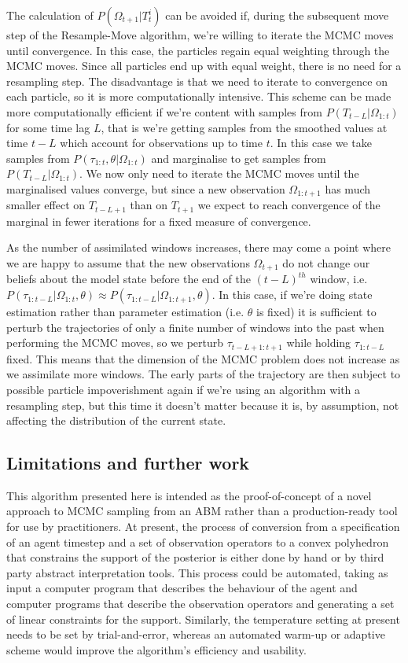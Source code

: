 \documentclass{article}
\begin{document}
The calculation of $P(\Omega_{t+1}|T^i_t)$ can be avoided if, during the subsequent move step of the Resample-Move algorithm, we're willing to iterate the MCMC moves until convergence. In this case, the particles regain equal weighting through the MCMC moves. Since all particles end up with equal weight, there is no need for a resampling step. The disadvantage is that we need to iterate to convergence on each particle, so it is more computationally intensive. This scheme can be made more computationally efficient if we're content with samples from $P(T_{t-L}|\Omega_{1:t})$ for some time lag $L$, that is we're getting samples from the smoothed values at time $t-L$ which account for observations up to time $t$. In this case we take samples from $P(\tau_{1:t},\theta|\Omega_{1:t})$ and marginalise to get samples from $P(T_{t-L}|\Omega_{1:t})$. We now only need to iterate the MCMC moves until the marginalised values converge, but since a new observation $\Omega_{1:t+1}$ has much smaller effect on $T_{t-L+1}$ than on $T_{t+1}$ we expect to reach convergence of the marginal in fewer iterations for a fixed measure of convergence.

As the number of assimilated windows increases, there may come a point where we are happy to assume that the new observations $\Omega_{t+1}$ do not change our beliefs about the model state before the end of the $(t-L)^{th}$ window, i.e. $P(\tau_{1:t-L}|\Omega_{1:t},\theta) \approx P(\tau_{1:t-L}|\Omega_{1:t+1},\theta)$. In this case, if we're doing state estimation rather than parameter estimation (i.e. $\theta$ is fixed) it is sufficient to perturb the trajectories of only a finite number of windows into the past when performing the MCMC moves, so we perturb $\tau_{t-L+1:t+1}$ while holding $\tau_{1:t-L}$ fixed. This means that the dimension of the MCMC problem does not increase as we assimilate more windows. The early parts of the trajectory are then subject to possible particle impoverishment again if we're using an algorithm with a resampling step, but this time it doesn't matter because it is, by assumption, not affecting the distribution of the current state.

\subsection{Limitations and further work}

This algorithm presented here is intended as the proof-of-concept of a novel approach to MCMC sampling from an ABM rather than a production-ready tool for use by practitioners. At present, the process of conversion from a specification of an agent timestep and a set of observation operators to a convex polyhedron that constrains the support of the posterior is either done by hand or by third party abstract interpretation tools. This process could be automated, taking as input a computer program that describes the behaviour of the agent and computer programs that describe the observation operators and generating a set of linear constraints for the support. Similarly, the temperature setting at present needs to be set by trial-and-error, whereas an automated warm-up or adaptive scheme would improve the algorithm's efficiency and usability.
\end{document}

